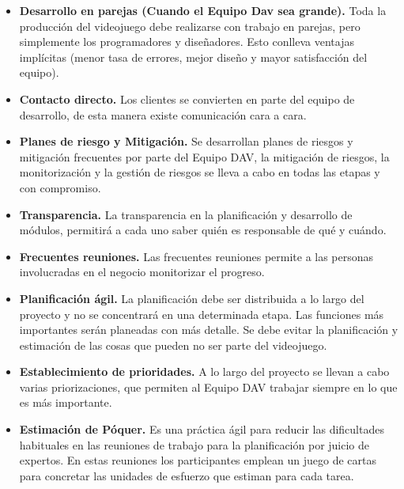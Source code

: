 \documentclass[a4paper, openright, 12pt]{report}
\begin{document}
\begin{itemize}
\item \textbf{Desarrollo en parejas (Cuando el Equipo Dav sea grande).} Toda la producción del videojuego debe realizarse con trabajo en parejas, pero simplemente los programadores y diseñadores. Esto conlleva ventajas implícitas (menor tasa de errores, mejor diseño y mayor satisfacción del equipo). \cite{Implementacion2011} 
\item \textbf{Contacto directo.} Los clientes se convierten en parte del equipo de desarrollo, de esta manera existe comunicación cara a cara. \cite{Implementacion2011} 
\item \textbf{Planes de riesgo y Mitigación.} Se desarrollan planes de riesgos y mitigación frecuentes por parte del Equipo DAV, la mitigación de riesgos, la monitorización y la gestión de riesgos se lleva a cabo en todas las etapas y con compromiso. \cite{Implementacion2011} 
\item \textbf{Transparencia.} La transparencia en la planificación y desarrollo de módulos, permitirá a cada uno saber quién es responsable de qué y cuándo. \cite{Implementacion2011} 
\item \textbf{Frecuentes reuniones.} Las frecuentes reuniones permite a las personas involucradas en el negocio monitorizar el progreso. \cite{Implementacion2011} 
\item \textbf{Planificación ágil.} La planificación debe ser distribuida a lo largo del proyecto y no se concentrará en una determinada etapa. Las funciones más importantes serán planeadas con más detalle. Se debe evitar la planificación y estimación de las cosas que pueden no ser parte del videojuego. \cite{Implementacion2011} 
\item \textbf{Establecimiento de prioridades.} A lo largo del proyecto se llevan a cabo varias priorizaciones, que permiten al Equipo DAV trabajar siempre en lo que es más importante. \cite{Implementacion2011} 
\item \textbf{Estimación de Póquer.} Es una práctica ágil para reducir las dificultades habituales en las reuniones de trabajo para la planificación por juicio de expertos. En estas reuniones los participantes emplean un juego de cartas para concretar las unidades de esfuerzo que estiman para cada tarea. \cite{Implementacion2011} 
\end{itemize}
\end{document}
